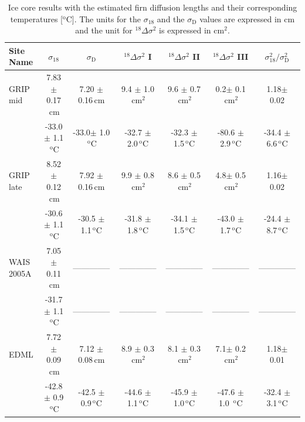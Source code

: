 \documentclass[11pt, draftcls, onecolumn]{IEEEtran} %
\numberwithin{equation}{section}
\numberwithin{table}{section}
\numberwithin{figure}{section}
\begin{document}
\begin{table}[]
\center
	\caption{Ice core results with the estimated firn diffusion lengths and their corresponding temperatures [$^\mathrm{o}$C].
		  The units for the $\sigma_{18}$ and the $\sigma_{\mathrm{D}}$ values are expressed in $\mathrm{cm}$ and the unit for ${}^{18}\Delta\sigma^2$
		is expressed in $\mathrm{cm}^2$.  }\label{tbl:icecore_results}
	\begin{tabular}{l c c c c c c} 
		\toprule
		Site Name & $\sigma_{18}$ & $\sigma_{\mathrm{D}}$ & ${}^{18}\Delta\sigma^2$  I & ${}^{18}\Delta\sigma^2$  II & ${}^{18}\Delta\sigma^2$  III & $\sigma^2_{18}/\sigma^2_{\mathrm{D}}$\\
		\midrule
		GRIP mid & 7.83 $\pm$ 0.17$\,\mathrm{cm}$& 7.20 $\pm$ 0.16$\,\mathrm{cm}$& 9.4 $\pm$ 1.0$\,\mathrm{cm}^2$& 9.6 $\pm$ 0.7$\,\mathrm{cm}^2$& 0.2$\pm$ 0.1$\,\mathrm{cm}^2$& 1.18$\pm$ 0.02\\
		& -33.0$\pm$ 1.1$\,^\mathrm{o}$C & -33.0$\pm$ 1.0$\,^\mathrm{o}$C& -32.7 $\pm$ 2.0$\,^\mathrm{o}$C& -32.3 $\pm$ 1.5$\,^\mathrm{o}$C& -80.6 $\pm$ 2.9$\,^\mathrm{o}$C& -34.4 $\pm$ 6.6$\,^\mathrm{o}$C\\
	
		GRIP late&8.52 $\pm$ 0.12$\,\mathrm{cm}$& 7.92 $\pm$ 0.16$\,\mathrm{cm}$& 9.9 $\pm$ 0.8$\,\mathrm{cm}^2$& 8.6 $\pm$ 0.5$\,\mathrm{cm}^2$& 4.8$\pm$ 0.5$\,\mathrm{cm}^2$& 1.16$\pm$ 0.02\\
		& -30.6 $\pm$ 1.1$\,^\mathrm{o}$C & -30.5 $\pm$ 1.1$\,^\mathrm{o}$C& -31.8 $\pm$ 1.8$\,^\mathrm{o}$C& -34.1 $\pm$ 1.5$\,^\mathrm{o}$C& -43.0 $\pm$ 1.7$\,^\mathrm{o}$C& -24.4 $\pm$ 8.7$\,^\mathrm{o}$C\\

		WAIS 2005A &7.05 $\pm$ 0.11$\,\mathrm{cm}$&--------------& --------------& --------------&--------------&--------------\\
		& -31.7 $\pm$ 1.1$\,^\mathrm{o}$C &-------------- &--------------&-------------- & --------------& --------------\\

		EDML &7.72 $\pm$ 0.09$\,\mathrm{cm}$& 7.12 $\pm$ 0.08$\,\mathrm{cm}$& 8.9 $\pm$ 0.3$\,\mathrm{cm}^2$& 8.1 $\pm$ 0.3$\,\mathrm{cm}^2$& 7.1$\pm$ 0.2$\,\mathrm{cm}^2$& 1.18$\pm$ 0.01\\
		& -42.8 $\pm$ 0.9$\,^\mathrm{o}$C & -42.5 $\pm$ 0.9$\,^\mathrm{o}$C& -44.6 $\pm$ 1.1$\,^\mathrm{o}$C& -45.9 $\pm$ 1.0$\,^\mathrm{o}$C& -47.6 $\pm$ 1.0 $\,^\mathrm{o}$C& -32.4 $\pm$ 3.1$\,^\mathrm{o}$C\\
		

\end{tabular}
\end{table}
\end{document}
